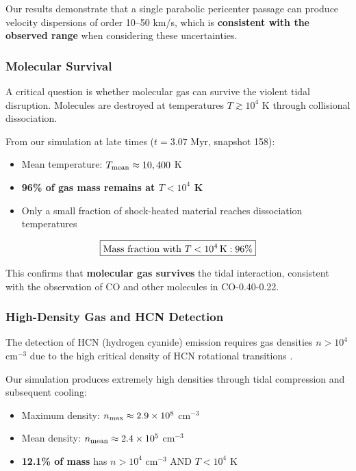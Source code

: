 \documentclass[twocolumn,amsmath,amssymb,prd,superscriptaddress,nofootinbib]{revtex4-2}
\begin{document}
Our results demonstrate that a single parabolic pericenter passage can produce velocity dispersions of order 10--50 km/s, which is \textbf{consistent with the observed range} when considering these uncertainties.

\subsubsection{Molecular Survival}
\label{sec:molecular_survival}

A critical question is whether molecular gas can survive the violent tidal disruption. Molecules are destroyed at temperatures $T \gtrsim 10^4$ K through collisional dissociation.

From our simulation at late times ($t = 3.07$ Myr, snapshot 158):
\begin{itemize}
    \item Mean temperature: $T_{\rm mean} \approx 10,400$ K
    \item \textbf{96\% of gas mass remains at $T < 10^4$ K}
    \item Only a small fraction of shock-heated material reaches dissociation temperatures
\end{itemize}

\begin{equation}
    \boxed{\text{Mass fraction with } T < 10^4\,{\rm K}: 96\%}
\end{equation}

This confirms that \textbf{molecular gas survives} the tidal interaction, consistent with the observation of CO and other molecules in CO-0.40-0.22.

\subsubsection{High-Density Gas and HCN Detection}
\label{sec:hcn}

The detection of HCN (hydrogen cyanide) emission requires gas densities $n > 10^4$ cm$^{-3}$ due to the high critical density of HCN rotational transitions \cite{Shirley2015}.

Our simulation produces extremely high densities through tidal compression and subsequent cooling:
\begin{itemize}
    \item Maximum density: $n_{\rm max} \approx 2.9 \times 10^8$ cm$^{-3}$
    \item Mean density: $n_{\rm mean} \approx 2.4 \times 10^5$ cm$^{-3}$
    \item \textbf{12.1\% of mass} has $n > 10^4$ cm$^{-3}$ AND $T < 10^4$ K
\end{itemize}
\end{document}
